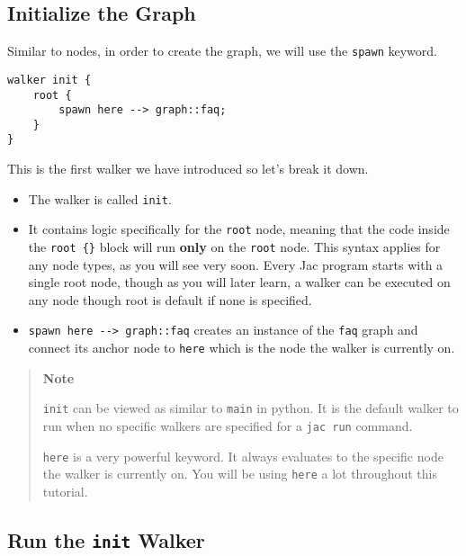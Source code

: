 \subsection{Initialize the Graph}\label{initialize-the-graph}

Similar to nodes, in order to create the graph, we will use the
\lstinline!spawn! keyword.

\begin{lstlisting}
walker init {
    root {
        spawn here --> graph::faq;
    }
}
\end{lstlisting}

This is the first walker we have introduced so let's break it down.

\begin{itemize}
    \tightlist
    \item
          The walker is called \lstinline!init!.
    \item
          It contains logic specifically for the \lstinline!root! node, meaning
          that the code inside the \lstinline!root {}! block will run
          \textbf{only} on the \lstinline!root! node. This syntax applies for
          any node types, as you will see very soon. Every Jac program starts
          with a single root node, though as you will later learn, a walker can
          be executed on any node though root is default if none is specified.
    \item
          \lstinline!spawn here --> graph::faq! creates an instance of the
          \lstinline!faq! graph and connect its anchor node to \lstinline!here!
          which is the node the walker is currently on.
\end{itemize}

\begin{quote}
    \textbf{Note}

    \lstinline!init! can be viewed as similar to \lstinline!main! in python.
    It is the default walker to run when no specific walkers are specified
    for a \lstinline!jac run! command.

    \lstinline!here! is a very powerful keyword. It always evaluates to the
    specific node the walker is currently on. You will be using
    \lstinline!here! a lot throughout this tutorial.
\end{quote}

\subsection{\texorpdfstring{Run the \texttt{init}
        Walker}{Run the init Walker}}\label{run-the-init-walker}

